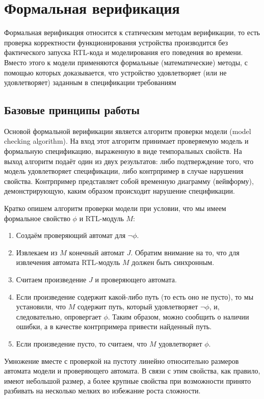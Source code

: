 \section{Формальная верификация}

\tab Формальная верификация относится к статическим методам верификации, то есть проверка корректности функционирования устройства производится без фактического запуска RTL-кода и моделирования его поведения во времени. Вместо этого к модели применяются формальные (математические) методы, с помощью которых доказывается, что устройство удовлетворяет (или не удовлетворяет) заданным в спецификации требованиям

\subsection{Базовые принципы работы}

\tab Основой формальной верификации является алгоритм проверки модели (model checking algorithm)\cite{formal_roadmap}. На вход этот алгоритм принимает проверяемую модель и формальную спецификацию, выраженную в виде темпоральных свойств. На выход алгоритм подаёт один из двух результатов: либо подтверждение того, что модель удовлетворяет спецификации, либо контрпример в случае нарушения свойства. Контрпример представляет собой временную диаграмму (вейвформу), демонстрирующую, каким образом происходит нарушение спецификации. 

Кратко опишем алгоритм проверки модели при условии, что мы имеем формальное свойство $\phi$ и RTL-модуль $M$: 
\begin{enumerate}
    \item Создаём проверяющий автомат для $\neg \phi$.
    \item Извлекаем из $M$ конечный автомат $J$. Обратим внимание на то, что для извлечения автомата RTL-модуль $M$ должен быть синхронным.
    \item Считаем произведение $J$ и проверяющего автомата.
    \item Если произведение содержит какой-либо путь (то есть оно не пусто), то мы установили, что $M$ содержит путь, который удовлетворяет $\neg \phi$, и, следовательно, опровергает $\phi$. Таким образом, можно сообщить о наличии ошибки, а в качестве контрпримера привести найденный путь.
    \item Если произведение пусто, то считаем, что $M$ удовлетворяет $\phi$.
\end{enumerate}

Умножение вместе с проверкой на пустоту линейно относительно размеров автомата модели и проверяющего автомата. В связи с этим свойства, как правило, имеют небольшой размер, а более крупные свойства при возможности принято разбивать на несколько мелких во избежание роста сложности. 

